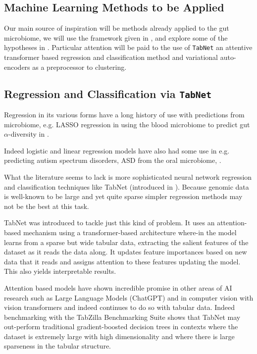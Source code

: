 \documentclass{article}
\begin{document}
\begin{multicols}{2}
\section{Machine Learning Methods to be Applied} 
Our main source of inspiration will be methods already applied to the gut microbiome, we will use the framework given in \cite{li_machine_2022}, and explore some of the hypotheses in \cite{tao_relationship_2024}. Particular attention will be paid to the use of \texttt{TabNet} an attentive transformer based regression and classification method and variational auto-encoders as a preprocessor to clustering.
\subsection{Regression and Classification via \texttt{TabNet}}
Regression in its various forms have a long history of use with predictions from microbiome, e.g. LASSO regression in using the blood microbiome to predict gut $\alpha$-diversity in \cite{wilmanski_blood_2019}. 

Indeed logistic and linear regression models have also had some use in e.g. predicting autism spectrum disorders, ASD from the oral microbiome, \cite{li_genetic_2022}. 

What the literature seems to lack is more sophisticated neural network regression and classification techniques like TabNet (introduced in \cite{arik_tabnet_2021}). Because genomic data is well-known to be large and yet quite sparse simpler regression methods may not be the best at this task. 

TabNet was introduced to tackle just this kind of problem. It uses an attention-based mechanism using a transformer-based \cite{vaswani_attention_2017} architecture where-in the model learns from a sparse but wide tabular data, extracting the salient features of the dataset as it reads the data along. It updates feature importances based on new data that it reads and assigns attention to these features updating the model. This also yields interpretable results.

Attention based models have shown incredible promise in other areas of AI research such as Large Language Models (ChatGPT) and in computer vision with vision transformers and indeed continues to do so with tabular data. Indeed benchmarking with the TabZilla Benchmarking Suite \cite{mcelfresh2023neural} shows that TabNet may out-perform traditional gradient-boosted decision trees in contexts where the dataset is extremely large with high dimensionality and where there is large sparseness in the tabular structure.


\end{multicols}
\end{document}
